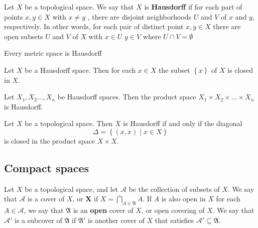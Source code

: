 \documentclass{article}
\theoremstyle{remark}
\begin{document}
\begin{definition}[Hausdorff]

    Let $X $ be a topological space. We say that $X$ is \textbf{Hausdorff} if for each part of points $x,y  \in X $ with
    $x\neq y$ , there are disjoint neighborhoods $U$ and $V$ of $x$ and $y$, respectively. In other words, for each pair
    of distinct point $x,y \in  X$ there are open subsets $U$ and $V$ of $X$ with $x \in U$ $y \in V $ where $U \cap V =
    \emptyset $
\end{definition}

\begin{theorem}
    Every metric space is Hausdorff

\end{theorem}

\begin{theorem}
    Let $X$ be a Hausdorff space. Then for each $x \in X$ the subset $\left\{ x  \right\}$ of $X$ is closed in  $X$.
\end{theorem}


\begin{theorem}
    Let $X_{1}, X_{2} \ldots, X_{n} $ be Hausdorff spaces.  Then the product space $X_{1} \times  X_{2}\times  \ldots
    \times X_{n}  $ is Hausdorff.

\end{theorem}


\begin{theorem}
Let $X$ be a topological space.  Then $X$ is Hausdorff if and only if the diagonal \[
    \Delta = \left\{ \left( x,x \right)  \mid  x \in  X \right\}
\]is closed in the product space $X \times  X$.
\end{theorem}

\subsection{Compact spaces}%
\label{sub:compace_spaces}

\begin{definition}
    Let $X$ be a topological space, and let $\mathscr{A} $ be the collection of subsets of $X$. We say that  $
    \mathscr{A} $ is a cover of $X$, or  \textbf{X} if $X = \bigcap_{A \in \mathfrak{A} }^{} A$. If $A$ is also open in
     $X$ for each  $A \in  \mathscr{A} $, we say that $\mathfrak{A} $ is an \textbf{open} cover of $X$, or open
     covering of $X$. We say that $ \mathscr{A}' $ is a subcover of $\mathfrak{A} $ if $\mathfrak{A} '  $ is another
     cover of $X$ that satisfies  $ \mathscr{A '} \subseteq \mathfrak{A}  $.

\end{definition}
\end{document}
